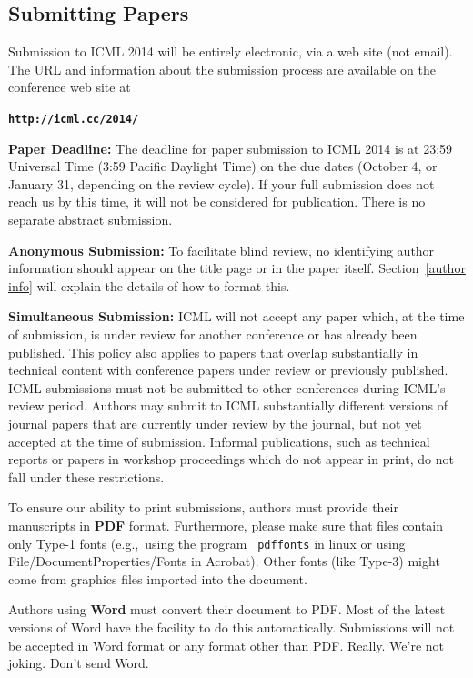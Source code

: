 \documentclass{article}
\begin{document}
\subsection{Submitting Papers}

Submission to ICML 2014 will be entirely electronic, via a web site
(not email).  The URL and information about the submission process
are available on the conference web site at

\textbf{\texttt{http://icml.cc/2014/}}

{\bf Paper Deadline:} The deadline for paper submission to ICML 2014
is at 23:59 Universal Time (3:59 Pacific Daylight Time) on the due dates
(October 4, or January 31, depending on the review cycle).  
If your full submission does not reach us by this time, it will 
not be considered for publication. There is no separate abstract submission.

{\bf Anonymous Submission:} To facilitate blind review, no identifying
author information should appear on the title page or in the paper
itself.  Section~\ref{author info} will explain the details of how to
format this.

{\bf Simultaneous Submission:} ICML will not accept any paper which,
at the time of submission, is under review for another conference or
has already been published. This policy also applies to papers that
overlap substantially in technical content with conference papers
under review or previously published. ICML submissions must not be
submitted to other conferences during ICML's review period. Authors
may submit to ICML substantially different versions of journal papers
that are currently under review by the journal, but not yet accepted
at the time of submission. Informal publications, such as technical
reports or papers in workshop proceedings which do not appear in
print, do not fall under these restrictions.

\medskip

To ensure our ability to print submissions, authors must provide their
manuscripts in \textbf{PDF} format.  Furthermore, please make sure
that files contain only Type-1 fonts (e.g.,~using the program {\tt
  pdffonts} in linux or using File/DocumentProperties/Fonts in
Acrobat).  Other fonts (like Type-3) might come from graphics files
imported into the document.

Authors using \textbf{Word} must convert their document to PDF.  Most
of the latest versions of Word have the facility to do this
automatically.  Submissions will not be accepted in Word format or any
format other than PDF. Really. We're not joking. Don't send Word.
\end{document}
